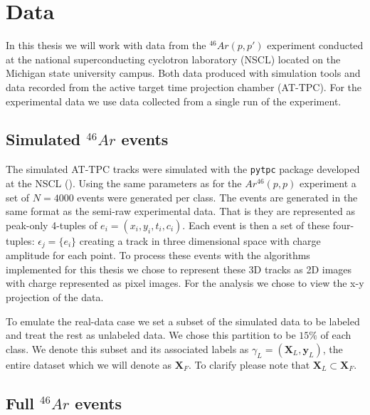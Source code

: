 \section{Data}\label{sec:data}

In this thesis we will work with data from the ${}^{46}Ar(p, p')$ experiment conducted at the national superconducting cyclotron laboratory (NSCL) located on the Michigan state university campus. Both data produced with simulation tools and data recorded from the active target time projection chamber (AT-TPC). For the experimental data we use data collected from a single run of the experiment.	

\subsection{Simulated \texorpdfstring{${}^{46}Ar$}{46Ar}  events}\label{sec:data_sim}

The simulated AT-TPC tracks were simulated with the \lstinline{pytpc} package developed at the NSCL (\cite{Bradt2017a}). Using the same parameters as for the $Ar^{46}(p, p)$ experiment a set of $N=4000$ events were generated per class. The events are generated in the same format as the semi-raw experimental data. That is they are represented as peak-only 4-tuples of $e_i = (x_i, y_i, t_i, c_i)$. Each event is then a set of these four-tuples: $\epsilon_j = \{e_i\}$ creating a track in three dimensional space with charge amplitude for each point. To process these events with the algorithms implemented for this thesis we chose to represent these 3D tracks as 2D images with charge represented as pixel images. For the analysis we chose to view the x-y projection of the data.

 To emulate the real-data case we set a subset of the simulated data to be labeled and treat the rest as unlabeled data. We chose this partition to be $15\%$ of each class. We denote this subset and its associated labels as $\gamma_L=(\mathbf{X}_L, \mathbf{y}_L)$, the entire dataset which we will denote as $\mathbf{X}_F$. To clarify please note that $\mathbf{X}_L \subset \mathbf{X}_F$.

\subsection{Full \texorpdfstring{${}^{46}Ar$}{46Ar}  events}\label{sec:data_real}

